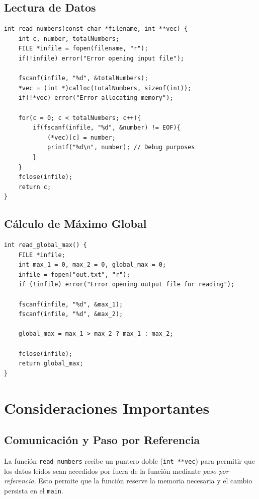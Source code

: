 \documentclass[12pt,a4paper]{article}
\begin{document}
\subsection*{Lectura de Datos}
\begin{lstlisting}
int read_numbers(const char *filename, int **vec) {
    int c, number, totalNumbers;
    FILE *infile = fopen(filename, "r");
    if(!infile) error("Error opening input file");
    
    fscanf(infile, "%d", &totalNumbers);
    *vec = (int *)calloc(totalNumbers, sizeof(int));
    if(!*vec) error("Error allocating memory");
    
    for(c = 0; c < totalNumbers; c++){
        if(fscanf(infile, "%d", &number) != EOF){
            (*vec)[c] = number;
            printf("%d\n", number); // Debug purposes
        }
    }
    fclose(infile);
    return c;
}
\end{lstlisting}

\newpage

\subsection*{Cálculo de Máximo Global}
\begin{lstlisting}
int read_global_max() {
    FILE *infile;
    int max_1 = 0, max_2 = 0, global_max = 0;
    infile = fopen("out.txt", "r");
    if (!infile) error("Error opening output file for reading");
    
    fscanf(infile, "%d", &max_1);
    fscanf(infile, "%d", &max_2);

    global_max = max_1 > max_2 ? max_1 : max_2;
    
    fclose(infile);
    return global_max;
}
\end{lstlisting}

\section*{Consideraciones Importantes}

\subsection*{Comunicación y Paso por Referencia}
La función \texttt{read\_numbers} recibe un puntero doble (\texttt{int **vec}) para permitir que los datos leídos sean accedidos por fuera de la función mediante \textit{paso por referencia}. Esto permite que la función reserve la memoria necesaria y el cambio persista en el \texttt{main}. 
\end{document}
